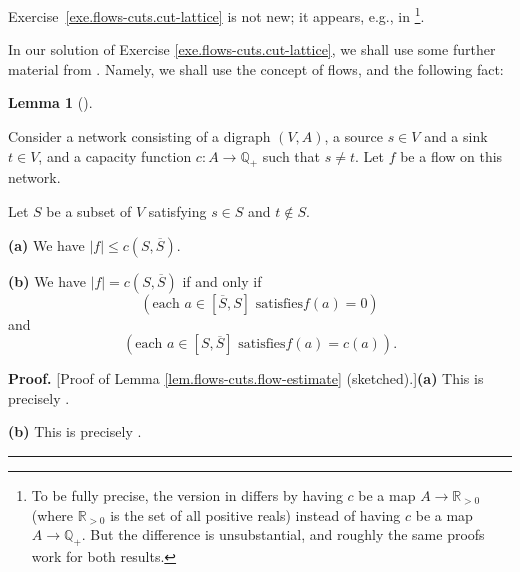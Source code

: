 \documentclass[numbers=enddot,12pt,final,onecolumn,notitlepage]{scrartcl}%
\theoremstyle{definition}
\newtheorem{lem}[theo]{Lemma}
\newenvironment{lemma}[1][]
{\begin{lem}[#1]\begin{leftbar}}
{\end{leftbar}\end{lem}}
\newenvironment{proof}[1][Proof]{\noindent\textbf{#1.} }{\ \rule{0.5em}{0.5em}}
\newcommand{\QQ}{\mathbb{Q}}
\newcommand{\RR}{\mathbb{R}}
\begin{document}
Exercise~\ref{exe.flows-cuts.cut-lattice} is not new;
it appears, e.g., in \cite[Corollary 3]{PicQue80}\footnote{To
  be fully precise, the version in
  \cite[Corollary 3]{PicQue80} differs by having $c$ be
  a map $A \to \RR_{> 0}$ (where $\RR_{> 0}$ is the set of
  all positive reals) instead of having $c$ be a map
  $A \to \QQ_+$. But the difference is unsubstantial,
  and roughly the same proofs work for both results.}.

In our solution of Exercise \ref{exe.flows-cuts.cut-lattice}, we shall use
some further material from
\cite{lec16}. Namely, we shall use the concept of flows, and the following fact:

\begin{lemma}
\label{lem.flows-cuts.flow-estimate}Consider a network consisting of a digraph
$\left(  V,A\right)  $, a source $s\in V$ and a sink $t\in V$, and a capacity
function $c:A\rightarrow\mathbb{Q}_{+}$ such that $s\neq t$. Let $f$ be a flow
on this network.

Let $S$ be a subset of $V$ satisfying $s\in S$ and $t\notin S$.

\textbf{(a)} We have $\left\vert f\right\vert \leq c\left(  S,\overline
{S}\right)  $.

\textbf{(b)} We have $\left\vert f\right\vert =c\left(  S,\overline{S}\right)
$ if and only if
\begin{equation}
\left(  \text{each }a\in\left[  \overline{S},S\right]  \text{ satisfies
}f\left(  a\right)  =0\right)  \label{eq.lem.flows-cuts.flow-estimate.b.1}
\end{equation}
and
\begin{equation}
\left(  \text{each }a\in\left[  S,\overline{S}\right]  \text{ satisfies
}f\left(  a\right)  =c\left(  a\right)  \right)
.\label{eq.lem.flows-cuts.flow-estimate.b.2}%
\end{equation}

\end{lemma}

\begin{proof}
[Proof of Lemma \ref{lem.flows-cuts.flow-estimate} (sketched).]\textbf{(a)}
This is precisely \cite[Proposition 1.7 \textbf{(c)}]{lec16}.

\textbf{(b)} This is precisely \cite[Proposition 1.7 \textbf{(d)}]{lec16}.
\end{proof}
\end{document}
